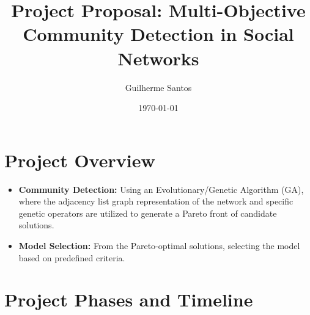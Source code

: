 \documentclass{article}
\title{Project Proposal: Multi-Objective Community Detection in Social Networks}
\author{Guilherme Santos}
\date{\today}
\begin{document}
\maketitle

\section{Project Overview}
\begin{itemize}
    \item \textbf{Community Detection:} Using an Evolutionary/Genetic Algorithm (GA), where the adjacency list graph representation of the network and specific genetic operators are utilized to generate a Pareto front of candidate solutions.
    \item \textbf{Model Selection:} From the Pareto-optimal solutions, selecting the model based on predefined criteria.
\end{itemize}

\section{Project Phases and Timeline}
\end{document}
